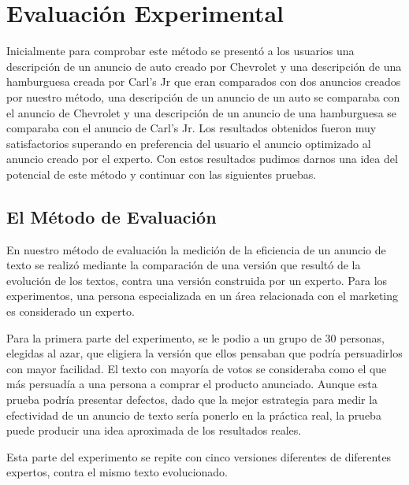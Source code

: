 
\chapter{Evaluación Experimental}

Inicialmente para comprobar este método se presentó a los usuarios una descripción de un anuncio de auto creado por Chevrolet y una descripción de una hamburguesa creada por Carl's Jr que eran comparados con dos anuncios creados por nuestro método, una descripción de un anuncio de un auto se comparaba con el anuncio de Chevrolet y una descripción de un anuncio de una hamburguesa se comparaba con el anuncio de Carl's Jr. Los resultados obtenidos fueron muy satisfactorios superando en preferencia del usuario el anuncio optimizado al anuncio creado por el experto. Con estos resultados pudimos darnos una idea del potencial de este método y continuar con las siguientes pruebas.

\clearpage
\section{El Método de Evaluación}

En nuestro método de evaluación la medición de la eficiencia de un anuncio de texto se realizó mediante la comparación de una versión que resultó de la evolución de los textos, contra una versión construida por un experto. Para los experimentos, una persona especializada en un área relacionada con el marketing es considerado un experto.
 
Para la primera parte del experimento, se le podio a un grupo de 30 personas, elegidas al azar, que eligiera la versión que ellos pensaban que podría persuadirlos con mayor facilidad. El texto con mayoría de votos se consideraba como el que más persuadía a una persona a comprar el producto anunciado. Aunque esta prueba podría presentar defectos, dado que la mejor estrategia para medir la efectividad de un anuncio de texto sería ponerlo en la práctica real, la prueba puede producir una idea aproximada de los resultados reales. 

Esta parte del experimento se repite con cinco versiones diferentes de diferentes expertos, contra el mismo texto evolucionado. 

